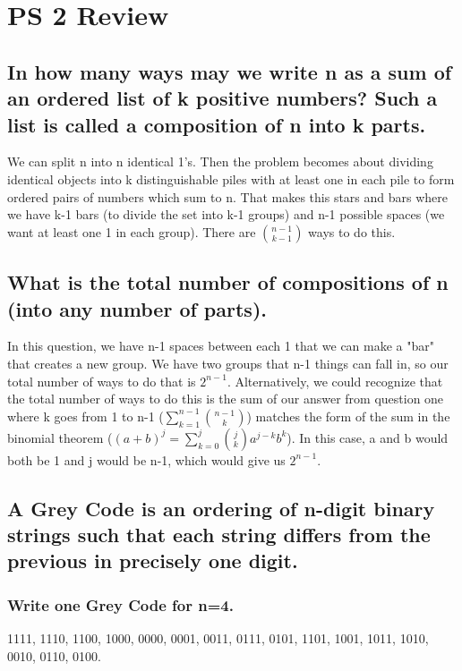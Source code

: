 \section{PS 2 Review}


\subsection{In how many ways may we write n as a sum of an ordered list of k positive numbers? Such a list is called a composition of n into k parts.}
We can split n into n identical 1's. Then the problem becomes about dividing identical objects into k distinguishable piles with at least one in each pile to form ordered pairs of numbers which sum to n. That makes this stars and bars where we have k-1 bars (to divide the set into k-1 groups) and n-1 possible spaces (we want at least one 1 in each group). There are $\binom{n-1}{k-1}$ ways to do this.


\subsection{What is the total number of compositions of n (into any number of parts).}
In this question, we have n-1 spaces between each 1 that we can make a "bar" that creates a new group. We have two groups that n-1 things can fall in, so our total number of ways to do that is \(2^{n-1}\). Alternatively, we could recognize that the total number of ways to do this is the sum of our answer from question one where k goes from 1 to n-1 (\(\sum^{n-1}_{k=1}\binom{n-1}{k}\)) matches the form of the sum in the binomial theorem (\((a+b)^{j} = \sum^{j}_{k=0}\binom{j}{k}a^{j-k}b^{k}\)). In this case, a and b would both be 1 and j would be n-1, which would give us \(2^{n-1}\).


\subsection{A Grey Code is an ordering of n-digit binary strings such that each string differs from the previous in precisely one digit.}


\subsubsection{Write one Grey Code for n=4.}
1111, 1110, 1100, 1000, 0000, 0001, 0011, 0111, 0101, 1101, 1001, 1011, 1010, 0010, 0110, 0100.

